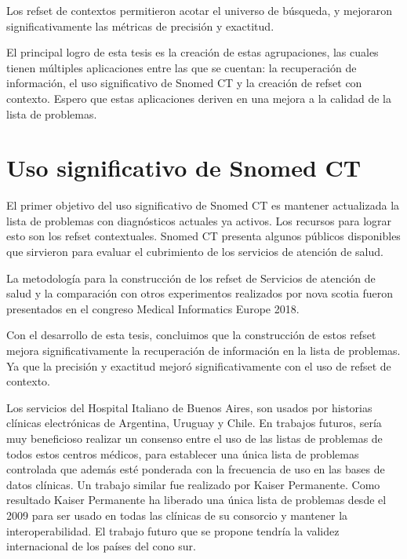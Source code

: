 Los \acrshort{refset} de contextos permitieron acotar el universo de búsqueda, y mejoraron significativamente las métricas de precisión y exactitud.

El principal logro de esta tesis es la creación de estas agrupaciones, las cuales tienen múltiples aplicaciones entre las que se cuentan: la recuperación de información, el uso significativo de Snomed CT y la creación de \acrshort{refset} con contexto. Espero que estas aplicaciones deriven en una mejora a la calidad de la lista de problemas.

\section{Uso significativo de Snomed CT}
El primer objetivo del uso significativo de Snomed CT es mantener actualizada la lista de problemas con diagnósticos actuales ya activos. Los recursos para lograr esto son los \acrshort{refset} contextuales. Snomed CT  presenta algunos públicos disponibles que sirvieron para evaluar el cubrimiento de los servicios de atención de salud.\cite{meaningfuluse}

La metodología para la construcción de los \acrshort{refset} de Servicios de atención de salud y la comparación con otros experimentos realizados por nova scotia\cite{nova} fueron presentados en el congreso Medical Informatics Europe 2018.\cite{Avila2018SelectionSubsets.}

Con el desarrollo de esta tesis, concluimos que la construcción de estos \acrshort{refset} mejora significativamente la recuperación de información en la lista de problemas. Ya que la precisión y exactitud mejoró significativamente con el uso de \acrshort{refset} de contexto.

Los servicios del Hospital Italiano de Buenos Aires, son usados por historias clínicas electrónicas de Argentina, Uruguay y Chile. En trabajos futuros, sería muy beneficioso realizar un consenso entre el uso de las listas de problemas de todos estos centros médicos, para establecer una única lista de problemas controlada que además esté ponderada con la frecuencia de uso en las bases de datos clínicas. Un trabajo similar fue realizado por Kaiser Permanente. Como resultado Kaiser Permanente ha liberado una única lista de problemas desde el 2009 para ser usado en todas las clínicas de su consorcio y mantener la interoperabilidad\cite{Dolin2004KaiserTerminology.}. El trabajo futuro que se propone tendría la validez internacional de los países del cono sur.

